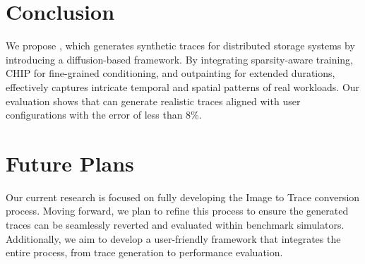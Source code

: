 \documentclass[
  manuscript=article,  %
  layout=preprint,  %
  year=20xx,
  volume=x,
]{extra/joas}
\begin{document}
\section{Conclusion}
We propose \Design, which generates synthetic traces for distributed storage systems by introducing a diffusion-based framework. By integrating sparsity-aware training, CHIP for fine-grained conditioning, and outpainting for extended durations, \Design effectively captures intricate temporal and spatial patterns of real workloads. Our evaluation shows that \Design can generate realistic traces aligned with user configurations with the error of less than 8\%.



\section{Future Plans}
Our current research is focused on fully developing the Image to Trace conversion process. Moving forward, we plan to refine this process to ensure the generated traces can be seamlessly reverted and evaluated within benchmark simulators. Additionally, we aim to develop a user-friendly framework that integrates the entire process, from trace generation to performance evaluation.


\printbibliography
\end{document}
